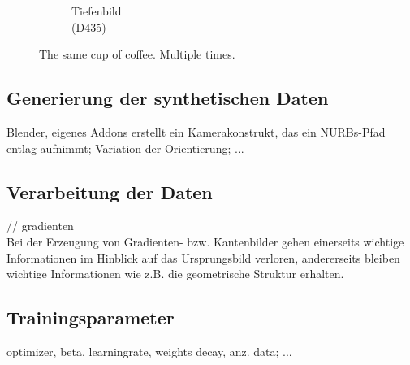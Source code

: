\begin{figure}[h!]
\begin{subfigure}[b]{0.3\linewidth}
		\caption{Tiefenbild \\ (D435) \hspace*{2cm}}
	\end{subfigure}
	\caption{The same cup of coffee. Multiple times.}
	\label{fig:coffee3}
\end{figure}


\subsection{Generierung der synthetischen Daten}
Blender,
eigenes Addons erstellt ein Kamerakonstrukt, das ein NURBs-Pfad entlag aufnimmt; Variation der Orientierung; ...

\subsection{Verarbeitung der Daten}
// gradienten\\
Bei der Erzeugung von Gradienten- bzw. Kantenbilder gehen einerseits wichtige Informationen im Hinblick auf das Ursprungsbild verloren, andererseits bleiben wichtige Informationen wie z.B. die geometrische Struktur erhalten.

\subsection{Trainingsparameter}
optimizer, beta,
learningrate,
weights decay, anz. data; ...